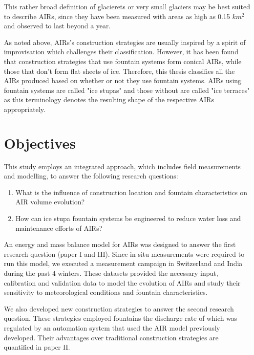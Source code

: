 This rather broad definition of glacierets or very small glaciers may be best suited to describe AIRs, since
they have been measured with areas as high as 0.15 $km^2$ and observed to last beyond a year.

As noted above, \ac{AIRs}'s construction strategies are usually inspired by a spirit of improvisation which challenges their
classification. However, it has been found that construction strategies that use fountain systems form conical
\ac{AIRs}, while those that don't form flat sheets of ice. Therefore, this thesis classifies all the \ac{AIRs} produced
based on whether or not they use fountain systems. \ac{AIRs} using fountain systems are called "ice stupas" and those
without are called "ice terraces" as this terminology denotes the resulting shape of the respective \ac{AIRs}
appropriately.

\section{Objectives}

This study employs an integrated approach, which includes field measurements and modelling, to answer the
following research questions: 

\begin{enumerate}

\item What is the influence of construction location and fountain characteristics on AIR volume evolution? 

\item How can ice stupa fountain systems be engineered to reduce water loss and maintenance efforts of \ac{AIRs}?

\end{enumerate}

An energy and mass balance model for \ac{AIRs} was designed to answer the first research question
(paper I and III). Since in-situ measurements were required to run this model, we executed a measurement campaign
in Switzerland and India during the past 4 winters. These datasets provided the necessary input, calibration and
validation data to model the evolution of \ac{AIRs} and study their sensitivity to meteorological conditions and
fountain characteristics. 

We also developed new construction strategies to answer the second research question. These
strategies employed fountains the discharge rate of which was regulated by an automation system that used the AIR model
previously developed. Their advantages over traditional construction strategies are quantified in paper II.

